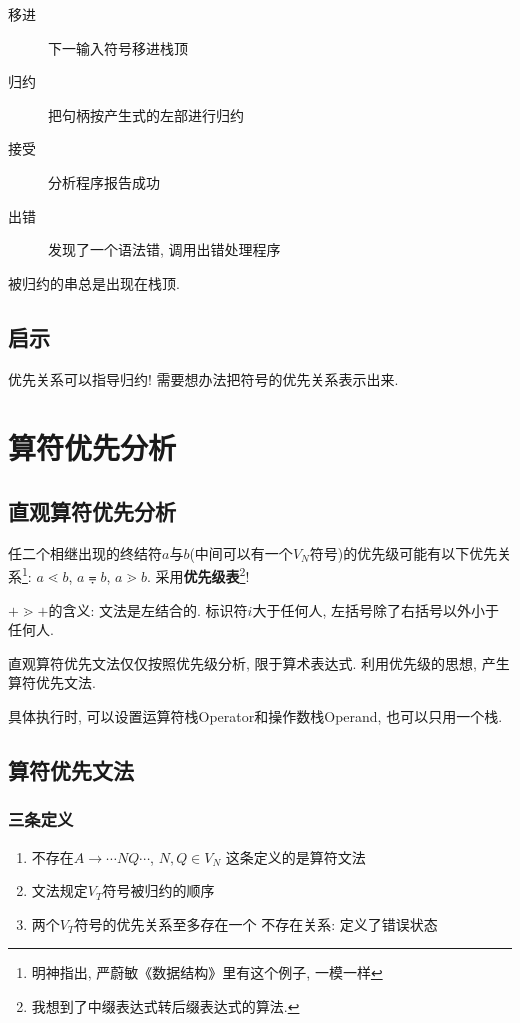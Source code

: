         \begin{description}
            \item[移进] 下一输入符号移进栈顶
            \item[归约] 把句柄按产生式的左部进行归约
            \item[接受] 分析程序报告成功
            \item[出错] 发现了一个语法错, 调用出错处理程序
        \end{description}

        被归约的串总是出现在栈顶.

        \subsection{启示} 优先关系可以指导归约! 需要想办法把符号的优先关系表示出来.

    \section{算符优先分析}

        \subsection{直观算符优先分析}

            任二个相继出现的终结符$a$与$b$(中间可以有一个$V_N$符号)的优先级可能有以下优先关系\footnote{明神指出, 严蔚敏《数据结构》里有这个例子, 一模一样}: $a\lessdot b$, $a\eqdot b$, $a\gtrdot b$. 采用\textbf{优先级表}\footnote{我想到了中缀表达式转后缀表达式的算法.}!

            $+\gtrdot+$的含义: 文法是左结合的. 标识符$i$大于任何人, 左括号除了右括号以外小于任何人.

            直观算符优先文法仅仅按照优先级分析, 限于算术表达式. 利用优先级的思想, 产生算符优先文法.

            具体执行时, 可以设置运算符栈Operator和操作数栈Operand, 也可以只用一个栈.

        \subsection{算符优先文法}

            \subsubsection{三条定义}

                \begin{enumerate}
                    \item 不存在$A\to \cdots NQ\cdots$, $N,Q\in V_N$ \hfill 这条定义的是算符文法
                    \item 文法规定$V_T$符号被归约的顺序
                    \item 两个$V_T$符号的优先关系至多存在一个 \hfill 不存在关系: 定义了错误状态
                \end{enumerate}

